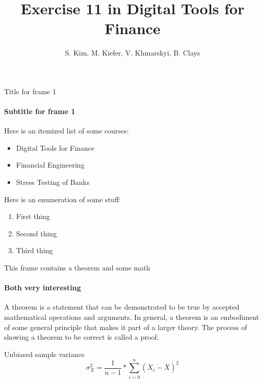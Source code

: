 \documentclass{beamer}
\title{Exercise 11 in Digital Tools for Finance}
\author{S. Kim\inst{1}, M. Kiefer\inst{1}, V. Khmarskyi\inst{1}, B. Clays\inst{2}}
\institute{\inst{1} University of Zürich, \inst{2} KU Leuven}
\begin{document}
\begin{frame}
\titlepage
\end{frame}

\begin{frame}{Title for frame 1}
\framesubtitle{Subtitle for frame 1}

Here is an itemized list of some courses:
\begin{itemize}
    \item Digital Tools for Finance
    \item Financial Engineering
    \item Stress Testing of Banks
\end{itemize}

\bigbreak

Here is an enumeration of some stuff:
\begin{enumerate}
    \item First thing
    \item Second thing
    \item Third thing
\end{enumerate}

\end{frame}
\begin{frame}{This frame contains a theorem and some math}
\framesubtitle{Both very interesting}

\begin{theorem}
A theorem is a statement that can be demonstrated to be true by accepted mathematical operations and arguments. In general, a theorem is an embodiment of some general principle that makes it part of a larger theory. The process of showing a theorem to be correct is called a proof.\footnotemark
\end{theorem}

\bigbreak

\begin{block}{Unbiased sample variance}
    \begin{equation}
        \sigma_X^2 =\frac{1}{n-1}*\sum_{i=0}^n (X_i-\overline{X})^2
    \end{equation}
\end{block}

\end{frame}
\end{document}
